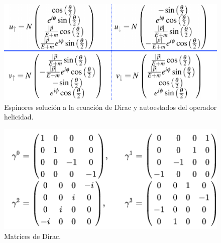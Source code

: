 \documentclass[paper=a4, fontsize=11pt]{scrartcl} %
\numberwithin{equation}{section} %
\numberwithin{figure}{section} %
\numberwithin{table}{section} %
\begin{document}
  

\begin{figure}[!h]
\begin{center}
\includegraphics[width=0.6\linewidth]{espinores.png}
\end{center}
\caption{Espinores solución a la ecuación de Dirac y autoestados del operador helicidad.}
\label{espinores}
\end{figure}


\begin{figure}[!h]
\begin{center}
\includegraphics[width=0.6\linewidth]{matrices.png}
\end{center}
\caption{Matrices de Dirac.}
\label{matrices}
\end{figure}
\end{document}
